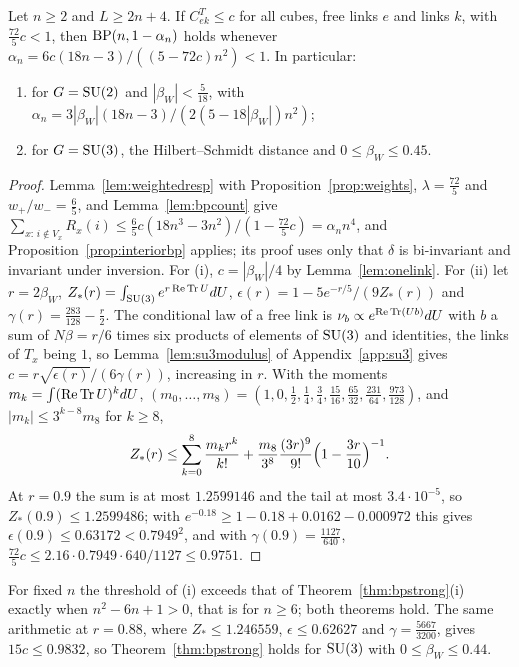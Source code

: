\begin{theorem}\label{thm:bpweighted}
Let $n\ge2$ and $L\ge2n+4$. If $C^T_{ek}\le c$ for all cubes, free links $e$
and links $k$, with $\frac{72}5c<1$, then $\mathrm{BP}(n,1-\alpha_n)$ holds whenever
$\alpha_n=6c(18n-3)/((5-72c)n^2)<1$. In particular:
\begin{enumerate}[label=\textup{(\roman*)},leftmargin=*]
\item for $G=\mathrm{SU}(2)$ and $|\beta_W|<\frac5{18}$, with
$\alpha_n=3|\beta_W|(18n-3)/(2(5-18|\beta_W|)n^2)$;
\item for $G=\mathrm{SU}(3)$, the Hilbert--Schmidt distance and $0\le\beta_W\le0.45$.
\end{enumerate}
\end{theorem}

\begin{proof}
Lemma~\ref{lem:weightedresp} with Proposition~\ref{prop:weights},
$\lambda=\frac{72}5$ and $w_+/w_-=\frac65$, and Lemma~\ref{lem:bpcount} give
$\sum_{x:\,i\notin V_x}R_x(i)\le\frac65c(18n^3-3n^2)/(1-\frac{72}5c)=
\alpha_nn^4$, and Proposition~\ref{prop:interiorbp} applies; its proof uses
only that $\delta$ is bi-invariant and invariant under inversion. For (i),
$c=|\beta_W|/4$ by Lemma~\ref{lem:onelink}. For (ii) let $r=2\beta_W$,
$Z_*(r)=\int_{\mathrm{SU}(3)}e^{r\operatorname{Re}\operatorname{Tr} U}dU$, $\epsilon(r)=1-5e^{-r/5}/(9Z_*(r))$ and
$\gamma(r)=\frac{283}{128}-\frac r2$. The conditional law of a free link is
$\nu_b\propto e^{\operatorname{Re}\operatorname{Tr}(Ub)}dU$ with $b$ a sum of $N\beta=r/6$ times six
products of elements of $\mathrm{SU}(3)$ and identities, the links of $T_x$ being
$1$, so Lemma~\ref{lem:su3modulus} of Appendix~\ref{app:su3} gives
$c=r\sqrt{\epsilon(r)}/(6\gamma(r))$, increasing in $r$. With the moments
$m_k=\int(\operatorname{Re}\operatorname{Tr} U)^kdU$, $(m_0,\dots,m_8)=(1,0,\frac12,\frac14,\frac34,
\frac{15}{16},\frac{65}{32},\frac{231}{64},\frac{973}{128})$, and $|m_k|\le
3^{k-8}m_8$ for $k\ge8$,
\[
Z_*(r)\le\sum_{k=0}^8\frac{m_kr^k}{k!}+\frac{m_8}{3^8}\frac{(3r)^9}{9!}
\Bigl(1-\frac{3r}{10}\Bigr)^{-1}.
\]
At $r=0.9$ the sum is at most $1.2599146$ and the tail at most
$3.4\cdot10^{-5}$, so $Z_*(0.9)\le1.2599486$; with $e^{-0.18}\ge1-0.18+0.0162
-0.000972$ this gives $\epsilon(0.9)\le0.63172<0.7949^2$, and with
$\gamma(0.9)=\frac{1127}{640}$, $\frac{72}5c\le2.16\cdot0.7949\cdot640/1127
\le0.9751$.
\end{proof}

For fixed $n$ the threshold of (i) exceeds that of
Theorem~\ref{thm:bpstrong}(i) exactly when $n^2-6n+1>0$, that is for $n\ge6$;
both theorems hold. The same arithmetic at $r=0.88$, where $Z_*\le1.246559$,
$\epsilon\le0.62627$ and $\gamma=\frac{5667}{3200}$, gives $15c\le0.9832$, so
Theorem~\ref{thm:bpstrong} holds for $\mathrm{SU}(3)$ with $0\le\beta_W\le0.44$.


